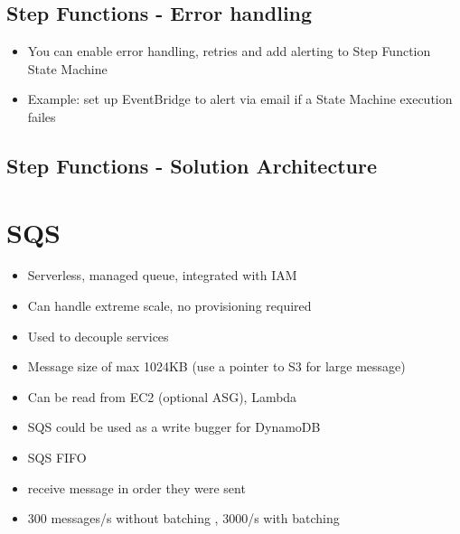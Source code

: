 \subsection{Step Functions - Error handling}
\begin{itemize}
    \item You can enable error handling, retries and add alerting to Step Function State Machine
    \item Example: set up EventBridge to alert via email if a State Machine execution failes
\end{itemize}

\subsection{Step Functions - Solution Architecture}


\section{SQS}

\begin{itemize}
    \item Serverless, managed queue, integrated with IAM
    \item Can handle extreme scale, no provisioning required
    \item Used to decouple services
    \item Message size of max 1024KB (use a pointer to S3 for large message)
    \item Can be read from EC2 (optional ASG), Lambda
    \item SQS could be used as a write bugger for DynamoDB
    \item SQS FIFO
    \item receive message in order they were sent
    \item 300 messages/s without batching , 3000/s with batching
\end{itemize}

